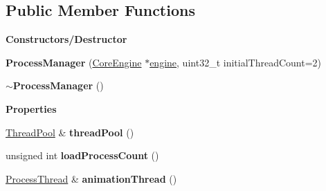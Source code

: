 \subsection*{Public Member Functions}
\begin{Indent}\textbf{ Constructors/\+Destructor}\par
\begin{DoxyCompactItemize}
\item 
\mbox{\label{classrev_1_1_process_manager_a685929e3ecb58d4c40e33eb616249880}} 
{\bfseries Process\+Manager} (\mbox{\hyperlink{classrev_1_1_core_engine}{Core\+Engine}} $\ast$\mbox{\hyperlink{classrev_1_1_manager_a0fbd0df6b4f3caf42b557f9702f48171}{engine}}, uint32\+\_\+t initial\+Thread\+Count=2)
\item 
\mbox{\label{classrev_1_1_process_manager_a333cbf8b0c0e4b227b610360488155f6}} 
{\bfseries $\sim$\+Process\+Manager} ()
\end{DoxyCompactItemize}
\end{Indent}
\begin{Indent}\textbf{ Properties}\par
\begin{DoxyCompactItemize}
\item 
\mbox{\label{classrev_1_1_process_manager_ac2e3b5e203125c34b1f860637badf2fd}} 
\mbox{\hyperlink{classrev_1_1_thread_pool}{Thread\+Pool}} \& {\bfseries thread\+Pool} ()
\item 
\mbox{\label{classrev_1_1_process_manager_a6396c72e79f92f32a3cfd85f2cfa2036}} 
unsigned int {\bfseries load\+Process\+Count} ()
\item 
\mbox{\label{classrev_1_1_process_manager_a22af8439e106920d799b87afb210ec6d}} 
\mbox{\hyperlink{classrev_1_1_process_thread}{Process\+Thread}} \& {\bfseries animation\+Thread} ()
\end{DoxyCompactItemize}
\end{Indent}
